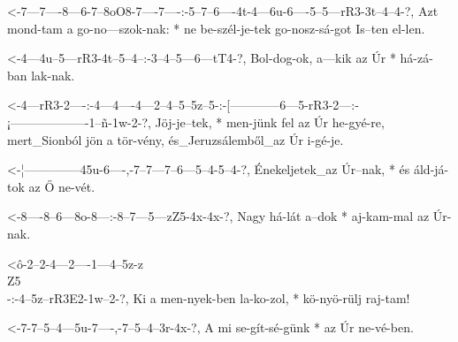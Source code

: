   {<-7---7----8---6-7--8oO8-7----7----:-5--7--6----4t-4---6u-6----5--5---rR3-3t--4--4-?,}
  {  Azt mond-tam a go-no---szok-nak: * ne be-szél-je-tek go-nosz-sá-got Is--ten el-len.}



  {<-4---4u--5---rR3-4t--5--4--:-3--4--5---6---tT4-?,}
  {  Bol-dog-ok, a---kik az Úr * há-zá-ban lak-nak.}

  {<-4---rR3-2----:-4---4----4---2--4--5--5z--5-:-[------------6---5-rR3-2---:-¡-------------------1--ñ-1w-2-?,}
  {  Jöj-je--tek, * men-jünk fel az Úr he-gyé-re, mert_Sionból jön a tör-vény, és_Jeruzsálemből_az Úr i-gé-je.}

  {<-¦--------------45u-6----,-7--7---7--6---5--4-5--4-?,}
  {  Énekeljetek_az Úr--nak, * és áld-já-tok az Ő ne-vét.}


  {<-8----8--6---8o-8---:-8--7---5---zZ5-4x-4x-?,}
  {  Nagy há-lát a--dok * aj-kam-mal az  Úr-nak.}


  {<ô-2--2-4---2----1---4--5z-z\\Z5\\-:-4--5z--rR3E2-1w--2-?,}
  {   Ki a men-nyek-ben la-ko-zol,    * kö-nyö-rülj  raj-tam!}

  {<-7-7--5--4---5u-7----,-7--5--4--3r-4x-?,}
  {  A mi se-gít-sé-günk * az Úr ne-vé-ben.}


